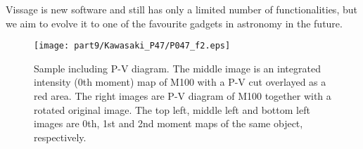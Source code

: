 Vissage is new software and still has only a limited number of functionalities, but we aim to evolve it to one of the favourite gadgets in astronomy in the future. 

\begin{figure}[tb]
  \centering
  \texttt{[image: part9/Kawasaki\_P47/P047\_f2.eps]}
  \caption{Sample including P-V diagram. The middle image is an integrated intensity (0th moment) map of M100 with a P-V cut overlayed as a red area. The right images are P-V diagram of M100 together with a rotated original image. The top left, middle left and bottom left images are 0th, 1st and 2nd moment maps of the same object, respectively.}
  \label{Kfig2}
\end{figure}


